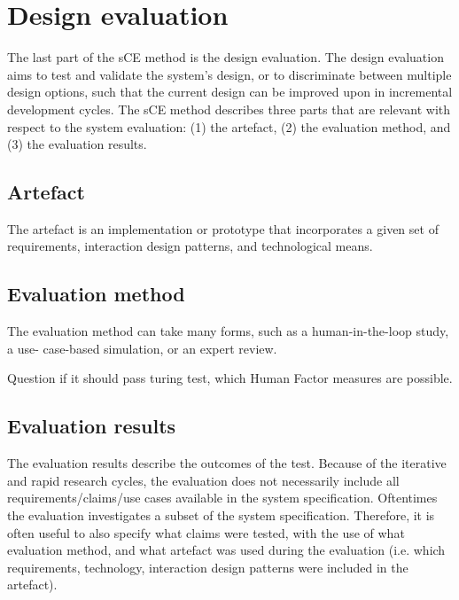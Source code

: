 \chapter{Design evaluation}
The last part of the sCE method is the design evaluation. The design evaluation aims to test and validate the system’s design, or to discriminate between multiple design options, such that the current design can be improved upon in incremental development cycles. The sCE method describes three parts that are relevant with respect to the system evaluation: (1) the artefact, (2) the evaluation method, and (3) the evaluation results.

\section{Artefact}
The artefact is an implementation or prototype that incorporates a given set of requirements, interaction design patterns, and technological means.

\section{Evaluation method}
The evaluation method can take many forms, such as a human-in-the-loop study, a use- case-based simulation, or an expert review.

Question if it should pass turing test, which Human Factor measures are possible.

\section{Evaluation results}
The evaluation results describe the outcomes of the test. Because of the iterative and rapid research cycles, the evaluation does not necessarily include all requirements/claims/use cases available in the system specification. Oftentimes the evaluation investigates a subset of the system specification. Therefore, it is often useful to also specify what claims were tested, with the use of what evaluation method, and what artefact was used during the evaluation (i.e. which requirements, technology, interaction design patterns were included in the artefact).